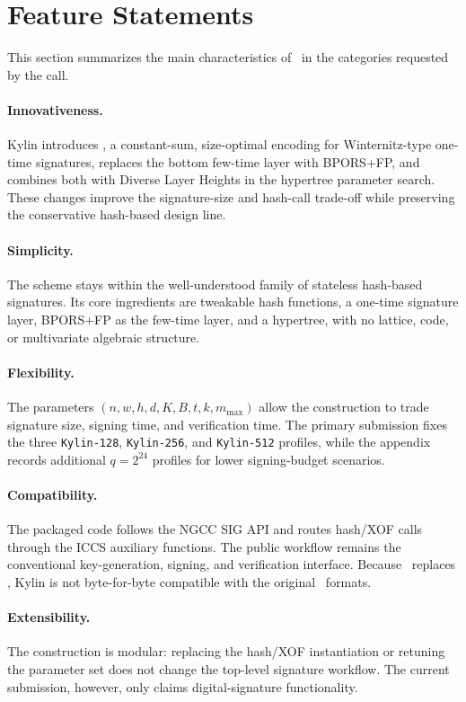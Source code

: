 \section{Feature Statements}
\label{sec:feature-statement}

This section summarizes the main characteristics of \SPHINCSA\ in the categories requested by the call.

\paragraph{Innovativeness.}
Kylin introduces \WOTSCS, a constant-sum, size-optimal encoding for Winternitz-type one-time signatures, replaces the bottom few-time layer with BPORS+FP, and combines both with Diverse Layer Heights in the hypertree parameter search. These changes improve the signature-size and hash-call trade-off while preserving the conservative hash-based design line.

\paragraph{Simplicity.}
The scheme stays within the well-understood family of stateless hash-based signatures. Its core ingredients are tweakable hash functions, a one-time signature layer, BPORS+FP as the few-time layer, and a hypertree, with no lattice, code, or multivariate algebraic structure.

\paragraph{Flexibility.}
The parameters $(n,w,h,d,K,B,t,k,m_{\max})$ allow the construction to trade signature size, signing time, and verification time. The primary submission fixes the three \texttt{Kylin-128}, \texttt{Kylin-256}, and \texttt{Kylin-512} profiles, while the appendix records additional $q=2^{24}$ profiles for lower signing-budget scenarios.

\paragraph{Compatibility.}
The packaged code follows the NGCC SIG API and routes hash/XOF calls through the ICCS auxiliary functions. The public workflow remains the conventional key-generation, signing, and verification interface. Because \WOTSCS\ replaces \WOTSP, Kylin is not byte-for-byte compatible with the original \SPHINCSP\ formats.

\paragraph{Extensibility.}
The construction is modular: replacing the hash/XOF instantiation or retuning the parameter set does not change the top-level signature workflow. The current submission, however, only claims digital-signature functionality.

